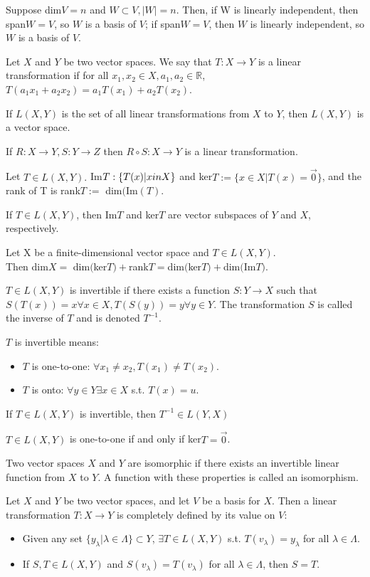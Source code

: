 \documentclass[11pt]{article} %
\begin{document}
Suppose dim$V = n$ and $W \subset V, |W| = n$. Then, if W is linearly independent, then span$W = V$, so $W$ is a basis of $V$; if span$W = V$, then $W$ is linearly independent, so $W$ is a basis of $V$.

Let $X$ and $Y$ be two vector spaces. We say that $T:X \rightarrow Y$ is a linear transformation if for all $x_1,x_2 \in X, a_1,a_2 \in \mathbb{R}$, $T(a_1x_1 + a_2x_2) = a_1T(x_1) + a_2T(x_2)$.

If $L(X,Y)$ is the set of all linear transformations from $X$ to $Y$, then $L(X,Y)$ is a vector space.

If $R:X\rightarrow Y, S:Y \rightarrow Z$ then $R \circ S:X \rightarrow Y$ is a linear transformation.

Let $T \in L(X,Y).$ Im$T: \{T(x)| x\\in X \}$ and ker$T:=\{ x \in X | T(x) = \vec{0}\}$, and the rank of T is rank$T := $ dim$($Im$(T)$.

If $T \in L(X,Y)$, then Im$T$ and ker$T$ are vector subspaces of $Y$ and $X$, respectively.

Let X be a finite-dimensional vector space and $T \in L(X,Y).$ \\ Then dim$X = $ dim$($ker$T) + $rank$T = $dim$($ker$T) + $dim$($Im$T).$

$T \in L(X,Y)$ is invertible if there exists a function $S:Y \rightarrow X$ such that $S(T(x)) = x \forall x \in X, T(S(y)) = y \forall y \in Y.$ The transformation $S$ is called the inverse of $T$ and is denoted $T^{-1}$.

$T$ is invertible means:
\begin{itemize}
\item $T$ is one-to-one: $\forall x_1 \neq x_2, T(x_1) \neq T(x_2)$.
\item $T$ is onto: $\forall y \in Y \exists x \in X$ s.t. $T(x) = u$.
\end{itemize}

If $T \in L(X,Y)$ is invertible, then $T^{-1} \in L(Y,X)$

$T \in L(X,Y)$ is one-to-one if and only if ker$T = \vec{0}$.

Two vector spaces $X$ and $Y$ are isomorphic if there exists an invertible linear function from $X$ to $Y$. A function with these properties is called an isomorphism.

Let $X$ and $Y$ be two vector spaces, and let $V$ be a basis for $X$. Then a linear transformation $T: X\rightarrow Y$ is completely defined by its value on $V$:
\begin{itemize}
\item Given any set $\{ y_{\lambda} | \lambda \in \Lambda\} \subset Y$, $\exists T \in L(X,Y)$ s.t. $T(v_{\lambda}) = y_{\lambda}$ for all $\lambda \in \Lambda$.
\item If $S,T \in L(X,Y)$ and $S(v_{\lambda}) = T(v_{\lambda})$ for all $\lambda \in \Lambda$, then $S = T$.
\end{itemize}
\end{document}
